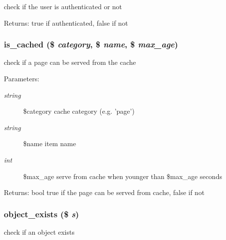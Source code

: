 check if the user is authenticated or not

\begin{Desc}
\item[Returns:]true if authenticated, false if not \end{Desc}
\hypertarget{common_8inc_8php_6fb34b9210b43349ca3eb16b2738a28b}{
\subsubsection[{is\_\-cached}]{\setlength{\rightskip}{0pt plus 5cm}is\_\-cached (\$ {\em category}, \/  \$ {\em name}, \/  \$ {\em max\_\-age})}}
\label{common_8inc_8php_6fb34b9210b43349ca3eb16b2738a28b}


check if a page can be served from the cache

\begin{Desc}
\item[Parameters:]
\begin{description}
\item[{\em string}]\$category cache category (e.g. 'page') \item[{\em string}]\$name item name \item[{\em int}]\$max\_\-age serve from cache when younger than \$max\_\-age seconds \end{description}
\end{Desc}
\begin{Desc}
\item[Returns:]bool true if the page can be served from cache, false if not \end{Desc}
\hypertarget{common_8inc_8php_3d71a269e01b98748fb57719feef27be}{
\subsubsection[{object\_\-exists}]{\setlength{\rightskip}{0pt plus 5cm}object\_\-exists (\$ {\em s})}}
\label{common_8inc_8php_3d71a269e01b98748fb57719feef27be}


check if an object exists

